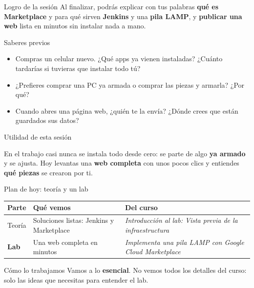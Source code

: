 \documentclass[aspectratio=169,10pt,c]{beamer}
\begin{document}
\begin{frame}[c]
\begin{block}{Logro de la sesión}
Al finalizar, podrás explicar con tus palabras \textbf{qué es Marketplace} y para qué sirven \textbf{Jenkins} y una \textbf{pila LAMP}, y \textbf{publicar una web} lista en minutos sin instalar nada a mano.
\end{block}
\end{frame}

\begin{frame}{Saberes previos}
\begin{itemize}\setlength\itemsep{10pt}
  \item Compras un celular nuevo. ¿Qué apps ya vienen instaladas? ¿Cuánto tardarías si tuvieras que instalar todo tú?
  \item ¿Prefieres comprar una PC ya armada o comprar las piezas y armarla? ¿Por qué?
  \item Cuando abres una página web, ¿quién te la envía? ¿Dónde crees que están guardados sus datos?
\end{itemize}
\end{frame}

\begin{frame}[c]{Utilidad de esta sesión}
\begin{center}
\begin{minipage}{.86\textwidth}
{\large En el trabajo casi nunca se instala todo desde cero: se parte de algo \textbf{ya armado} y se ajusta. Hoy levantas una \textbf{web completa} con unos pocos clics y entiendes \textbf{qué piezas} se crearon por ti.}
\end{minipage}
\end{center}
\end{frame}

\begin{frame}{Plan de hoy: teoría y un lab}
\renewcommand{\arraystretch}{1.35}
\centering\small
\begin{tabular}{@{}p{1.4cm}p{6.6cm}p{4.9cm}@{}}
\toprule
\textbf{Parte} & \textbf{Qué vemos} & \textbf{Del curso}\\
\midrule
Teoría & Soluciones listas: Jenkins y Marketplace & \emph{Introducción al lab: Vista previa de la infraestructura}\\
\textbf{Lab} & Una web completa en minutos & \emph{Implementa una pila LAMP con Google Cloud Marketplace}\\
\bottomrule
\end{tabular}
\par\vspace{3mm}
\begin{alertblock}{Cómo lo trabajamos}
\small Vamos a lo \textbf{esencial}. No vemos todos los detalles del curso: solo las ideas que necesitas para entender el lab.
\end{alertblock}
\end{frame}
\end{document}
